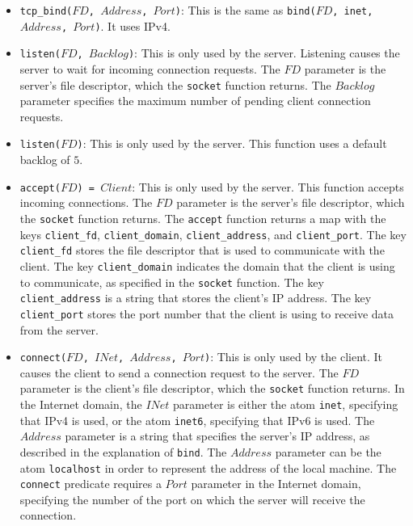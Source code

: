 \begin{itemize}
\item \texttt{tcp\_bind($FD$, $Address$, $Port$)}: This is the same as \texttt{bind($FD$, inet, $Address$, $Port$)}.   It uses IPv4.
\item \texttt{listen($FD$, $Backlog$)}: This is only used by the server.  Listening causes the server to wait for incoming connection requests.  The $FD$ parameter is the server's file descriptor, which the \texttt{socket} function returns.  The $Backlog$ parameter specifies the maximum number of pending client connection requests.
\item \texttt{listen($FD$)}: This is only used by the server.  This function uses a default backlog of $5$.
\item \texttt{accept($FD$) = $Client$}: This is only used by the server.  This function accepts incoming connections.  The $FD$ parameter is the server's file descriptor, which the \texttt{socket} function returns.  The \texttt{accept} function returns a map with the keys \texttt{client\_fd}, \texttt{client\_domain}, \texttt{client\_address}, and \texttt{client\_port}.  The key \texttt{client\_fd} stores the file descriptor that is used to communicate with the client.  The key \texttt{client\_domain} indicates the domain that the client is using to communicate, as specified in the \texttt{socket} function.  The key \texttt{client\_address} is a string that stores the client's IP address.  The key \texttt{client\_port} stores the port number that the client is using to receive data from the server.
\item \texttt{connect($FD$, $INet$, $Address$, $Port$)}: This is only used by the client.  It causes the client to send a connection request to the server.  The $FD$ parameter is the client's file descriptor, which the \texttt{socket} function returns.  In the Internet domain, the $INet$ parameter is either the atom \texttt{inet}, specifying that IPv4 is used, or the atom \texttt{inet6}, specifying that IPv6 is used.  The $Address$ parameter is a string that specifies the server's IP address, as described in the explanation of \texttt{bind}.  The $Address$ parameter can be the atom \texttt{localhost} in order to represent the address of the local machine.   The \texttt{connect} predicate requires a $Port$ parameter in the Internet domain, specifying the number of the port on which the server will receive the connection. 

\end{itemize}

